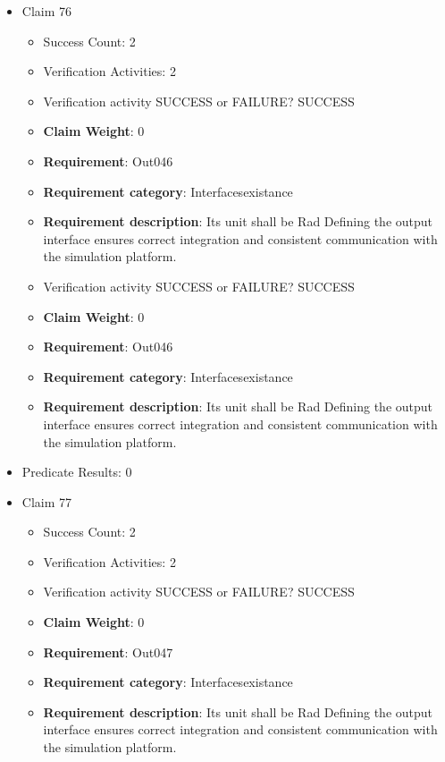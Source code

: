 \documentclass{article}
\begin{document}
\begin{itemize}
  				  \item Claim 76
				\begin{itemize}
			    	\item Success Count: 2 
			    	\item Verification Activities: 2
					\item Verification activity SUCCESS or FAILURE? SUCCESS
					\item \textbf{Claim Weight}: 0
						\item \textbf{Requirement}: Out046 
						\item \textbf{Requirement category}: Interfacesexistance 
						\item \textbf{Requirement description}: Its unit shall be Rad Defining the output interface ensures correct integration and consistent communication with the simulation platform.
					
					\item Verification activity SUCCESS or FAILURE? SUCCESS
					\item \textbf{Claim Weight}: 0
						\item \textbf{Requirement}: Out046 
						\item \textbf{Requirement category}: Interfacesexistance 
						\item \textbf{Requirement description}: Its unit shall be Rad Defining the output interface ensures correct integration and consistent communication with the simulation platform.
					
				\end{itemize}
				
									    
				\item Predicate Results: 0

  				  \item Claim 77
				\begin{itemize}
			    	\item Success Count: 2 
			    	\item Verification Activities: 2
					\item Verification activity SUCCESS or FAILURE? SUCCESS
					\item \textbf{Claim Weight}: 0
						\item \textbf{Requirement}: Out047 
						\item \textbf{Requirement category}: Interfacesexistance 
						\item \textbf{Requirement description}: Its unit shall be Rad Defining the output interface ensures correct integration and consistent communication with the simulation platform.
					

\end{itemize}
\end{itemize}
\end{document}
